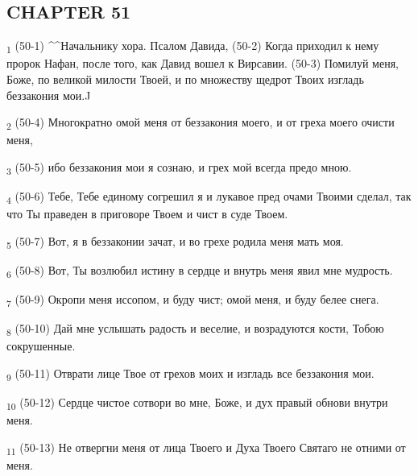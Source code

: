 \subsection{CHAPTER 51}
\begin{tcolorbox}
\textsubscript{1} (50-1) ^^Начальнику хора. Псалом Давида, (50-2) Когда приходил к нему пророк Нафан, после того, как Давид вошел к Вирсавии. (50-3) Помилуй меня, Боже, по великой милости Твоей, и по множеству щедрот Твоих изгладь беззакония мои.^^
\end{tcolorbox}
\begin{tcolorbox}
\textsubscript{2} (50-4) Многократно омой меня от беззакония моего, и от греха моего очисти меня,
\end{tcolorbox}
\begin{tcolorbox}
\textsubscript{3} (50-5) ибо беззакония мои я сознаю, и грех мой всегда предо мною.
\end{tcolorbox}
\begin{tcolorbox}
\textsubscript{4} (50-6) Тебе, Тебе единому согрешил я и лукавое пред очами Твоими сделал, так что Ты праведен в приговоре Твоем и чист в суде Твоем.
\end{tcolorbox}
\begin{tcolorbox}
\textsubscript{5} (50-7) Вот, я в беззаконии зачат, и во грехе родила меня мать моя.
\end{tcolorbox}
\begin{tcolorbox}
\textsubscript{6} (50-8) Вот, Ты возлюбил истину в сердце и внутрь меня явил мне мудрость.
\end{tcolorbox}
\begin{tcolorbox}
\textsubscript{7} (50-9) Окропи меня иссопом, и буду чист; омой меня, и буду белее снега.
\end{tcolorbox}
\begin{tcolorbox}
\textsubscript{8} (50-10) Дай мне услышать радость и веселие, и возрадуются кости, Тобою сокрушенные.
\end{tcolorbox}
\begin{tcolorbox}
\textsubscript{9} (50-11) Отврати лице Твое от грехов моих и изгладь все беззакония мои.
\end{tcolorbox}
\begin{tcolorbox}
\textsubscript{10} (50-12) Сердце чистое сотвори во мне, Боже, и дух правый обнови внутри меня.
\end{tcolorbox}
\begin{tcolorbox}
\textsubscript{11} (50-13) Не отвергни меня от лица Твоего и Духа Твоего Святаго не отними от меня.
\end{tcolorbox}
